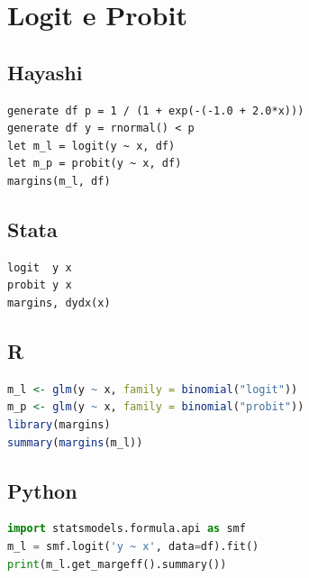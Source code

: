 \section{Logit e Probit}

\subsection*{Hayashi}

\begin{lstlisting}
generate df p = 1 / (1 + exp(-(-1.0 + 2.0*x)))
generate df y = rnormal() < p
let m_l = logit(y ~ x, df)
let m_p = probit(y ~ x, df)
margins(m_l, df)
\end{lstlisting}

\subsection*{Stata}

\begin{lstlisting}[language={}, basicstyle=\ttfamily\small,
  frame=single, numbers=none, backgroundcolor=\color{codbg}]
logit  y x
probit y x
margins, dydx(x)
\end{lstlisting}

\subsection*{R}

\begin{lstlisting}[language=R, basicstyle=\ttfamily\small,
  frame=single, numbers=none, backgroundcolor=\color{codbg},
  keywordstyle=\color{keyword}\bfseries,
  stringstyle=\color{string},
  commentstyle=\color{comment}\itshape]
m_l <- glm(y ~ x, family = binomial("logit"))
m_p <- glm(y ~ x, family = binomial("probit"))
library(margins)
summary(margins(m_l))
\end{lstlisting}

\subsection*{Python}

\begin{lstlisting}[language=Python, basicstyle=\ttfamily\small,
  frame=single, numbers=none, backgroundcolor=\color{codbg},
  keywordstyle=\color{keyword}\bfseries,
  stringstyle=\color{string},
  commentstyle=\color{comment}\itshape]
import statsmodels.formula.api as smf
m_l = smf.logit('y ~ x', data=df).fit()
print(m_l.get_margeff().summary())
\end{lstlisting}

